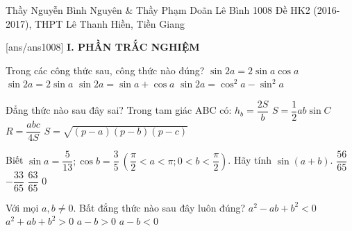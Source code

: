 \begin{name}
{Thầy Nguyễn Bình Nguyên \& Thầy Phạm Doãn Lê Bình }
{1008 Đề HK2 (2016-2017), THPT Lê Thanh Hiền, Tiền Giang}
\end{name}
\setcounter{ex}{0}
[ans/ans1008]
\noindent\textbf{I. PHẦN TRẮC NGHIỆM}
\begin{ex}%
Trong các công thức sau, công thức nào đúng?
\choice
{\True $\sin 2a=2\sin a \cos a$}
{$\sin 2a=2\sin a$}
{$\sin 2a=\sin a+\cos a$}
{$\sin 2a=\cos^2a-\sin^2a$}
\end{ex}

\begin{ex}%
Đẳng thức nào sau đây sai? Trong tam giác ABC có:
\choice
{$h_b=\dfrac{2S}{b}$}
{$S=\dfrac{1}{2}ab\sin C$}
{$R=\dfrac{abc}{4S}$}
{\True $S=\sqrt{(p-a)(p-b)(p-c)}$}
\end{ex}

\begin{ex}%
Biết $\sin a=\dfrac{5}{13};\cos b=\dfrac{3}{5} \ \left(\dfrac{\pi}{2}<a<\pi; 0<b<\dfrac{\pi}{2} \right)$.  Hãy tính $\sin (a+b)$.
\choice
{$\dfrac{56}{65}$}
{\True $-\dfrac{33}{65}$}
{$\dfrac{63}{65}$}
{$0$}
\end{ex}

\begin{ex}%
Với mọi $a,b\ne 0.$ Bất đẳng thức nào sau đây luôn đúng?
\choice
{$a^2-ab+b^2<0$}
{\True $a^2+ab+b^2>0$}
{$a-b>0$}
{$a-b<0$}
\end{ex}

